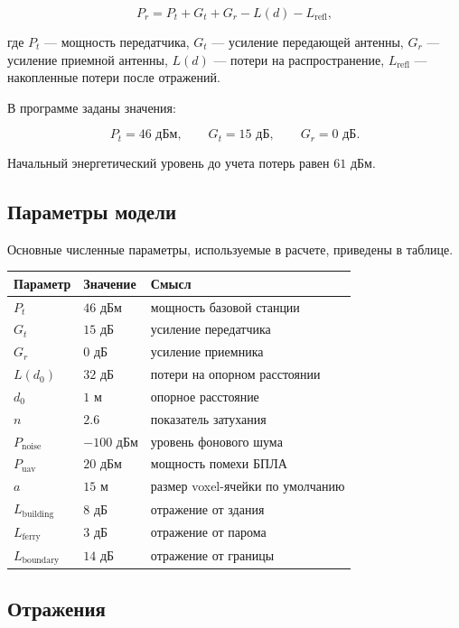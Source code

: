 \documentclass[12pt,a4paper]{article}
\begin{document}
\[
P_r = P_t + G_t + G_r - L(d) - L_{\text{refl}},
\]

где $P_t$ --- мощность передатчика, $G_t$ --- усиление передающей антенны, $G_r$ --- усиление приемной антенны, $L(d)$ --- потери на распространение, $L_{\text{refl}}$ --- накопленные потери после отражений.

В программе заданы значения:

\[
P_t = 46\text{ дБм}, \qquad G_t = 15\text{ дБ}, \qquad G_r = 0\text{ дБ}.
\]

Начальный энергетический уровень до учета потерь равен $61$ дБм.

\subsection{Параметры модели}

Основные численные параметры, используемые в расчете, приведены в таблице.

\begin{center}
\begin{tabular}{lll}
\toprule
Параметр & Значение & Смысл \\
\midrule
$P_t$ & $46$ дБм & мощность базовой станции \\
$G_t$ & $15$ дБ & усиление передатчика \\
$G_r$ & $0$ дБ & усиление приемника \\
$L(d_0)$ & $32$ дБ & потери на опорном расстоянии \\
$d_0$ & $1$ м & опорное расстояние \\
$n$ & $2.6$ & показатель затухания \\
$P_{\text{noise}}$ & $-100$ дБм & уровень фонового шума \\
$P_{\text{uav}}$ & $20$ дБм & мощность помехи БПЛА \\
$a$ & $15$ м & размер voxel-ячейки по умолчанию \\
$L_{\text{building}}$ & $8$ дБ & отражение от здания \\
$L_{\text{ferry}}$ & $3$ дБ & отражение от парома \\
$L_{\text{boundary}}$ & $14$ дБ & отражение от границы \\
\bottomrule
\end{tabular}
\end{center}

\subsection{Отражения}
\end{document}

